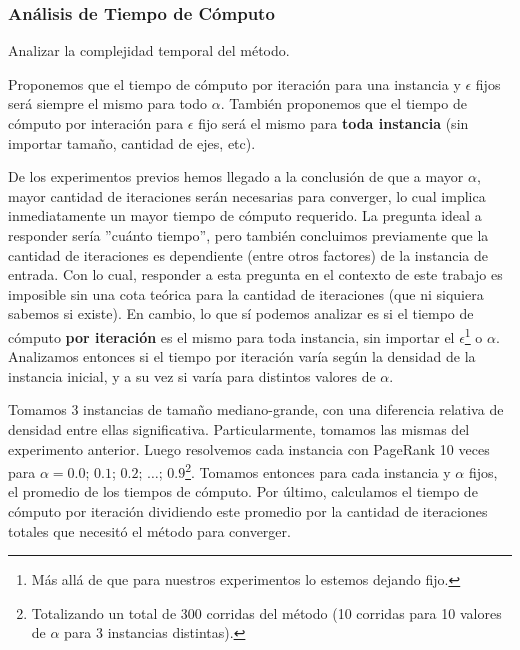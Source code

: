 \subsubsection{An\'alisis de Tiempo de C\'omputo}
\label{subsec:exp4}
\begin{LaTeXdescription}
    \item[Objetivo] Analizar la complejidad temporal del m\'etodo.\\

    \item[Hip\'otesis] Proponemos que el tiempo de c\'omputo por iteraci\'on
        para una instancia y $\epsilon$ fijos ser\'a siempre el mismo para todo
        $\alpha$. Tambi\'en proponemos que el tiempo de c\'omputo por interación
        para $\epsilon$ fijo ser\'a el mismo para \textbf{toda instancia} (sin
        importar tama\~no, cantidad de ejes, etc).\\

    \item[Proposici\'on] De los experimentos previos hemos llegado a la
        conclusi\'on de que a mayor $\alpha$, mayor cantidad de iteraciones
        ser\'an necesarias para converger, lo cual implica inmediatamente un
        mayor tiempo de c\'omputo requerido. La pregunta ideal a responder
        ser\'ia ''cu\'anto tiempo'', pero tambi\'en concluimos previamente que
        la cantidad de iteraciones es dependiente (entre otros factores) de la
        instancia de entrada. Con lo cual, responder a esta pregunta en el
        contexto de este trabajo es imposible sin una cota te\'orica para la
        cantidad de iteraciones (que ni siquiera sabemos si existe). En cambio,
        lo que s\'i podemos analizar es si el tiempo de c\'omputo \textbf{por
        iteraci\'on} es el mismo para toda instancia, sin importar el
        $\epsilon$\footnote{M\'as all\'a de que para nuestros experimentos lo
        estemos dejando fijo.} o $\alpha$. Analizamos entonces si el tiempo por
        iteraci\'on var\'ia seg\'un la densidad de la instancia inicial, y a su
        vez si varía para distintos valores de $\alpha$.\\

    \item[M\'etodo de Experimentaci\'on] Tomamos 3 instancias de tama\~no
        mediano-grande, con una diferencia relativa de densidad entre ellas
        significativa. Particularmente, tomamos las mismas del experimento
        anterior. Luego resolvemos cada instancia con PageRank 10 veces para
        $\alpha=0.0$; $0.1$; $0.2$; $\dots$; $0.9$\footnote{Totalizando un total
        de 300 corridas del m\'etodo (10 corridas para 10 valores de $\alpha$
        para 3 instancias distintas).}. Tomamos entonces para cada instancia y
        $\alpha$ fijos, el promedio de los tiempos de c\'omputo. Por \'ultimo,
        calculamos el tiempo de c\'omputo por iteraci\'on dividiendo este
        promedio por la cantidad de iteraciones totales que necesit\'o el
        m\'etodo para converger.\\

    \item[Resultados, an\'alisis y discusi\'on]
\end{LaTeXdescription}

